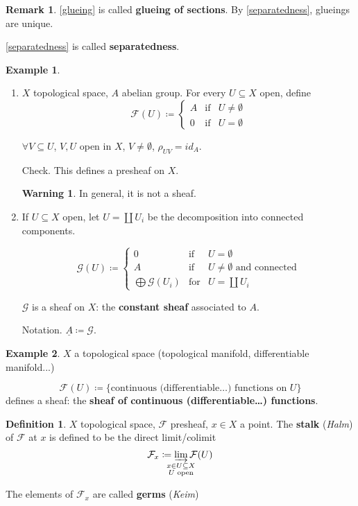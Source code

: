 \documentclass[12pt]{article}
\theoremstyle{definition}
\newtheorem*{definition}{Definition}
\newtheorem*{remark}{Remark}
\newtheorem*{warning}{Warning}
\newtheorem*{example}{Example}
\begin{document}
\begin{remark}
\ref{glueing} is called \textbf{glueing of sections}. By \ref{separatedness}, glueings are unique.

\ref{separatedness} is called \textbf{separatedness}.
\end{remark}

\begin{example}
\begin{enumerate}
\item $X$ topological space, $A$ abelian group. For every $U\subseteq X$ open, define
\[\mathcal F(U)\coloneqq\left\{\begin{array}{lll}A&\text{if}&U\neq\emptyset\\0&\text{if}&U=\emptyset\end{array}\right.\]

$\forall V\subseteq U$, $V,U$ open in $X$, $V\neq\emptyset$, $\rho_{UV}=id_A$.

Check. This defines a presheaf on $X$.

\begin{warning}
In general, it is not a sheaf.
\end{warning}

\item If $U\subseteq X$ open, let $U=\coprod U_i$ be the decomposition into connected components.

\[\mathcal G(U)\coloneqq\left\{\begin{array}{lll}0&\text{if}&U=\emptyset\\A&\text{if}&U\neq\emptyset\text{ and connected}\\\bigoplus\mathcal G(U_i)&\text{for}&U=\coprod U_i\end{array}\right.\]

$\mathcal G$ is a sheaf on $X$: the \textbf{constant sheaf} associated to $A$.

Notation. $\underline{A}\coloneqq\mathcal G$.
\end{enumerate}
\end{example}

\begin{example}
$X$ a topological space (topological manifold, differentiable manifold...)

\[\mathcal F(U)\coloneqq\{\text{continuous (differentiable\ldots) functions on }U\}\]
defines a sheaf: the \textbf{sheaf of continuous (differentiable\ldots) functions}.
\end{example}

\begin{definition}
$X$ topological space, $\mathcal F$ presheaf, $x\in X$ a point. The \textbf{stalk} (\emph{Halm}) of $\mathcal F$ at $x$ is defined to be the direct limit/colimit
\[\mathcal F_x\coloneqq\varinjlim_{\mathclap{\substack{x\in U\subseteq X\\U\text{ open}}}}\mathcal F(U)\]

The elements of $\mathcal F_x$ are called \textbf{germs} (\emph{Keim})
\end{definition}
\end{document}
